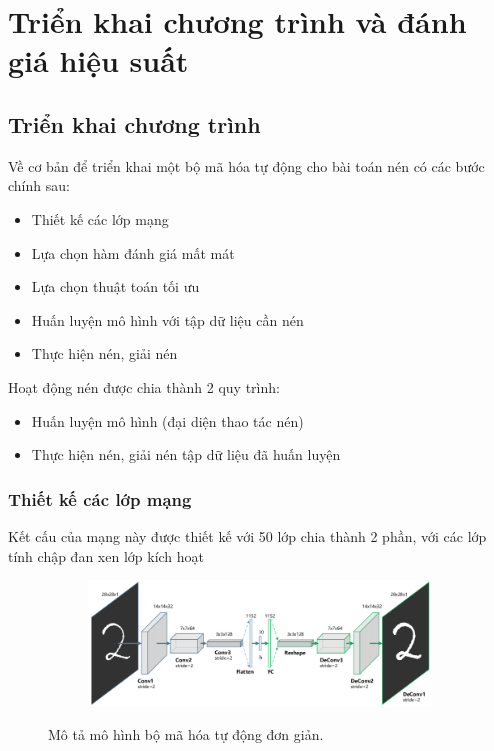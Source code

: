 \chapter{Triển khai chương trình và đánh giá hiệu suất}
\label{cha:chap3}

\section{Triển khai chương trình}
Về cơ bản để triển khai một bộ mã hóa tự động cho bài toán nén
có các bước chính sau:
\begin{itemize}[leftmargin=1.5cm]
    \item Thiết kế các lớp mạng
    \item Lựa chọn hàm đánh giá mất mát
    \item Lựa chọn thuật toán tối ưu
    \item Huấn luyện mô hình với tập dữ liệu cần nén
    \item Thực hiện nén, giải nén
\end{itemize}

Hoạt động nén được chia thành 2 quy trình:
\begin{itemize}[leftmargin=1.5cm]
    \item Huấn luyện mô hình (đại diện thao tác nén)
    \item Thực hiện nén, giải nén tập dữ liệu đã huấn luyện
\end{itemize}

\subsection{Thiết kế các lớp mạng}

Kết cấu của mạng này được thiết kế với 50 lớp chia thành 2 phần,
với các lớp tính chập đan xen lớp kích hoạt

\begin{figure}
    \begin{subfigure}{0.8\textwidth}
        \includegraphics[width=1.\linewidth]{Chapters/items/networks.jpg}

        \label{fig: net1}
    \end{subfigure}
    \caption{Mô tả mô hình bộ mã hóa tự động đơn giản.}
\end{figure}

